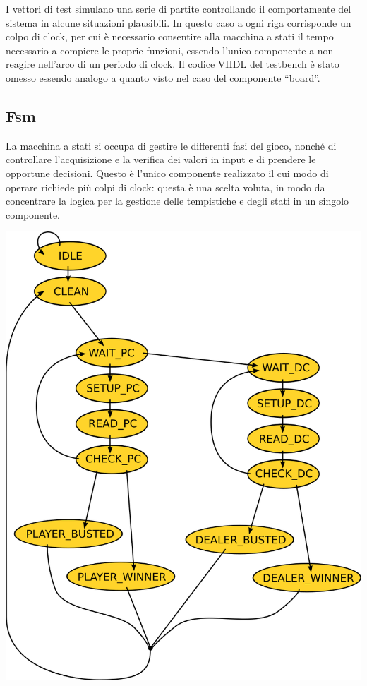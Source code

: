 \documentclass [11pt,a4paper,oneside,draft]{article}
\begin{document}


I vettori di test simulano una serie di partite controllando il 
comportamente del sistema in alcune situazioni plausibili.
In questo caso a ogni riga corrisponde un colpo di clock, per cui
è necessario consentire alla macchina a stati il tempo necessario
a compiere le proprie funzioni, essendo l'unico componente a non
reagire nell'arco di un periodo di clock. Il codice VHDL del 
testbench è stato omesso essendo analogo a quanto visto nel caso del
componente ``board''.

\subsection{Fsm}

La macchina a stati si occupa di gestire le differenti fasi del gioco,
nonché di controllare l'acquisizione e la verifica dei valori in input
e di prendere le opportune decisioni. Questo è l'unico componente
realizzato il cui modo di operare richiede più colpi di clock: questa
è una scelta voluta, in modo da concentrare la logica per la gestione
delle tempistiche e degli stati in un singolo componente.

\includegraphics{fsm}
\end{document}
